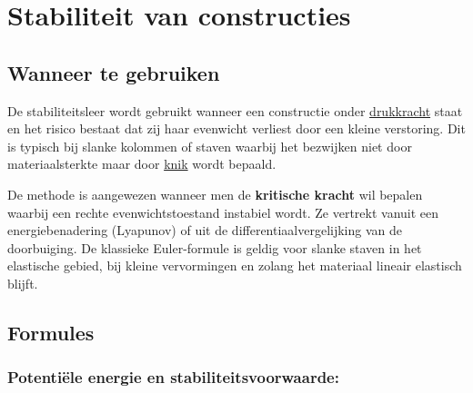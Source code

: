\documentclass[a4paper,11pt]{article}
\begin{document}
\newpage
\section{Stabiliteit van constructies}
 
\subsection*{Wanneer te gebruiken}

\noindent
De stabiliteitsleer wordt gebruikt wanneer een constructie onder \underline{drukkracht} staat en het risico bestaat dat zij haar evenwicht verliest door een kleine verstoring. Dit is typisch bij slanke kolommen of staven waarbij het bezwijken niet door materiaalsterkte maar door \underline{knik} wordt bepaald.

\vspace{.4cm}


\noindent
De methode is aangewezen wanneer men de \textbf{kritische kracht} wil bepalen waarbij een rechte evenwichtstoestand instabiel wordt. Ze vertrekt vanuit een energiebenadering (Lyapunov) of uit de differentiaalvergelijking van de doorbuiging. De klassieke Euler-formule is geldig voor slanke staven in het elastische gebied, bij kleine vervormingen en zolang het materiaal lineair elastisch blijft.



\vspace{.5cm}

\subsection*{Formules}
\vspace{.2cm}

\subsubsection*{Potentiële energie en stabiliteitsvoorwaarde:}
\vspace{.2cm}
\end{document}
